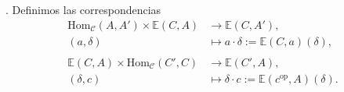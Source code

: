 \documentclass[preview]{standalone}
\begin{document}
\begin{center}
. Definimos las correspondencias \begin{align*} \text{Hom}_\mathscr{C}(A,A')\times\mathbb{E}(C,A) &\to \mathbb{E}(C,A'), \\ (a,\delta) &\mapsto a\cdot\delta:=\mathbb{E}(C,a)(\delta), \\ \\ \mathbb{E}(C,A)\times\text{Hom}_\mathscr{C}(C',C) &\to \mathbb{E}(C',A), \\ (\delta,c) &\mapsto \delta\cdot c:=\mathbb{E}(c^\text{op},A)(\delta). \end{align*}
\end{center}
\end{document}
